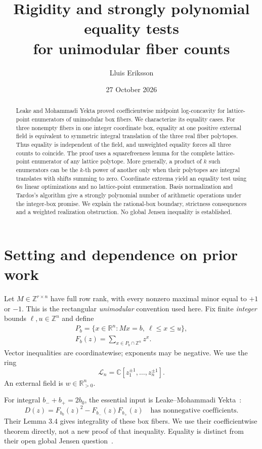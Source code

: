 \documentclass[11pt]{article}
\title{Rigidity and strongly polynomial equality tests\\for unimodular fiber counts}
\author{Lluis Eriksson}
\date{27 October 2026}
\newcommand{\Z}{\mathbb Z}\newcommand{\R}{\mathbb R}\newcommand{\C}{\mathbb C}
\begin{document}
\maketitle
\begin{abstract}
Leake and Mohammadi Yekta proved coefficientwise midpoint log-concavity for lattice-point enumerators of unimodular box fibers. We characterize its equality cases. For three nonempty fibers in one integer coordinate box, equality at one positive external field is equivalent to symmetric integral translation of the three real fiber polytopes. Thus equality is independent of the field, and unweighted equality forces all three counts to coincide. The proof uses a squarefreeness lemma for the complete lattice-point enumerator of any lattice polytope. More generally, a product of \(k\) such enumerators can be the \(k\)-th power of another only when their polytopes are integral translates with shifts summing to zero. Coordinate extrema yield an equality test using \(6n\) linear optimizations and no lattice-point enumeration. Basis normalization and Tardos's algorithm give a strongly polynomial number of arithmetic operations under the integer-box promise. We explain the rational-box boundary, strictness consequences and a weighted realization obstruction. No global Jensen inequality is established.
\end{abstract}

\section{Setting and dependence on prior work}
Let \(M\in\Z^{r\times n}\) have full row rank, with every nonzero maximal minor equal to \(+1\) or \(-1\). This is the rectangular \emph{unimodular} convention used here. Fix finite \emph{integer} bounds \(\ell,u\in\Z^n\) and define
\[
\begin{gathered}
P_b=\{x\in\R^n:Mx=b,\ \ell\le x\le u\},\\
F_b(z)=\sum_{x\in P_b\cap\Z^n}z^x.
\end{gathered}
\]
Vector inequalities are coordinatewise; exponents may be negative. We use the ring
\[\mathcal L_n=\C[z_1^{\pm1},\ldots,z_n^{\pm1}].\]
An external field is \(w\in\R_{>0}^n\).

For integral \(b_-+b_+=2b_0\), the essential input is Leake--Mohammadi Yekta~\cite[Theorem 3.1]{LMY}:
\begin{equation}\label{eq:input}
D(z)=F_{b_0}(z)^2-F_{b_-}(z)F_{b_+}(z)
\quad\text{has nonnegative coefficients.}
\end{equation}
Their Lemma 3.4 gives integrality of these box fibers. We use their coefficientwise theorem directly, not a new proof of that inequality. Equality is distinct from their open global Jensen question~\cite[Question 1.7]{LMY}.
\end{document}
